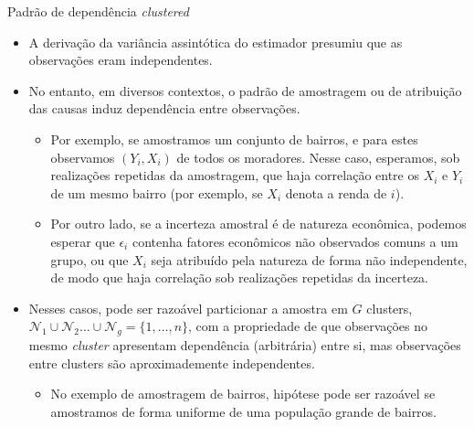 \documentclass[11pt]{beamer}
\begin{document}
	\begin{frame}{Padrão de dependência \textit{clustered}}
		\begin{itemize}
			\item A derivação da variância assintótica do estimador presumiu que as observações eram independentes.
			\item No entanto, em diversos contextos, {\color{blue}o padrão de amostragem ou de atribuição das causas} induz dependência entre observações.
			\begin{itemize}
				\item Por exemplo, se amostramos um conjunto de bairros, e para estes observamos $(Y_i,X_i)$ de todos os moradores. Nesse caso, esperamos, sob realizações repetidas da amostragem, que haja correlação entre os $X_i$ e $Y_i$ de um mesmo bairro (por exemplo, se $X_i$ denota a renda de $i$).
				\item Por outro lado, se a incerteza amostral é de natureza econômica, podemos esperar que $\epsilon_i$ contenha fatores econômicos não observados comuns a um grupo, ou que $X_i$ seja atribuído pela natureza de forma não independente, de modo que haja correlação sob realizações repetidas da incerteza.
			\end{itemize}
			\item Nesses casos, pode ser razoável particionar a amostra em $G$ {\color{blue}clusters}, $\mathcal{N}_1\cup \mathcal{N}_2 \ldots \cup  \mathcal{N}_g = \{1,\ldots, n\}$, com a propriedade de que observações no mesmo \textit{cluster}  apresentam dependência (arbitrária) entre si, mas observações entre clusters são aproximademente independentes.
			\begin{itemize}
				\item No exemplo de amostragem de bairros, hipótese pode ser razoável se amostramos de forma uniforme de uma população grande de bairros.
			\end{itemize}
		\end{itemize}
	\end{frame}
\end{document}
